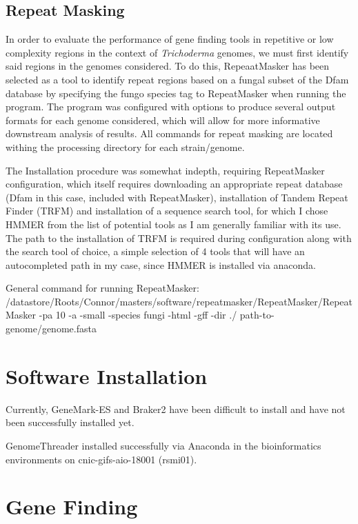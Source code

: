\documentclass[12pt]{article}
\begin{document}
\subsection{Repeat Masking}

In order to evaluate the performance of gene finding tools in
repetitive or low complexity regions in the context of
\textit{Trichoderma} genomes, we must first identify said regions in
the genomes considered. To do this, RepeaatMasker has been selected as
a tool to identify repeat regions based on a fungal subset of the Dfam
database by specifying the fungo species tag to RepeatMasker when
running the program. The program was configured with options to
produce several output formats for each genome considered, which will
allow for more informative downstream analysis of results. All
commands for repeat masking are located withing the processing
directory for each strain/genome.

The Installation procedure was somewhat indepth, requiring
RepeatMasker configuration, which itself requires downloading an
appropriate repeat database (Dfam in this case, included with
RepeatMasker), installation of Tandem Repeat Finder (TRFM) and
installation of a sequence search tool, for which I chose HMMER from
the list of potential tools as I am generally familiar with its
use. The path to the installation of TRFM is required during
configuration along with the search tool of choice, a simple selection
of 4 tools that will have an autocompleted path in my case, since
HMMER is installed via anaconda.

General command for running RepeatMasker:
/datastore/Roots/Connor/masters/software/repeatmasker/RepeatMasker/RepeatMasker
-pa 10 -a -small -species fungi -html -gff -dir ./
path-to-genome/genome.fasta


\section{Software Installation}

Currently, GeneMark-ES and Braker2 have been difficult to install and
have not been successfully installed yet.

GenomeThreader installed successfully via Anaconda in the
bioinformatics environments on cnic-gifs-aio-18001 (rsmi01).

\section{Gene Finding}
\end{document}

